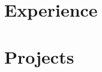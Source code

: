 \documentclass[letterpaper,11pt]{article}
\begin{document}


\section{Experience}
  \resumeSubHeadingListStart

    
    \vspace{5pt}

    
    \vspace{5pt}

    
    \vspace{5pt}

    
    \vspace{5pt}

    

  \resumeSubHeadingListEnd

\section{Projects}
    \resumeSubHeadingListStart
    
      
      \vspace{5pt}

      
    \resumeSubHeadingListEnd



\end{document}
